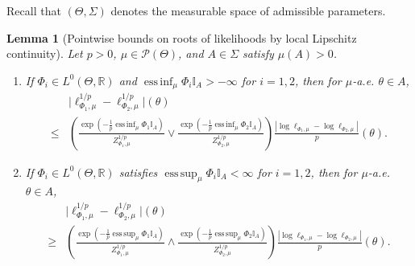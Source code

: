 \documentclass[a4paper]{scrartcl}
\newtheorem{lemma}[theorem]{Lemma}
\theoremstyle{definition}
\numberwithin{equation}{section}
\newcommand{\R}{\mathbb{R}}
\DeclareMathOperator*{\essinf}{ess\,inf}
\DeclareMathOperator*{\esssup}{ess\,sup}
\newcommand{\abs}[1]{\vert #1\vert}
\newcommand{\Abs}[1]{\left\vert#1\right\vert}
\begin{document}
Recall that $(\Theta,\Sigma)$ denotes the measurable space of admissible parameters.
\begin{lemma}[Pointwise bounds on roots of likelihoods by local Lipschitz continuity]
\label{lemma_preliminary_bounds_on_pth_root_likelihoods}
Let $p>0$, $\mu\in\mathcal{P}(\Theta)$, and $A\in\Sigma$ satisfy $\mu(A)>0$.
\begin{enumerate}
 \item \label{item_lemma_preliminary_bounds_on_pth_root_likelihoods_upper_bound}
 If $\Phi_i\in L^0(\Theta,\R)$ and $\essinf_\mu \Phi_i \mathbb{I}_A>-\infty$ for $i=1,2$, then for $\mu$-a.e. $\theta\in A$,
 \begin{align*}
   &\abs{\ell_{\Phi_1,\mu}^{1/p}-\ell_{\Phi_2,\mu}^{1/p}}(\theta)
   \\
   \leq&  \left(\frac{\exp(-\tfrac{1}{p}\essinf_\mu\Phi_1\mathbb{I}_A)}{Z_{\Phi_1,\mu}^{1/p}}\vee \frac{\exp(-\tfrac{1}{p}\essinf_\mu\Phi_2\mathbb{I}_A)}{Z_{\Phi_2,\mu}^{1/p}}\right)\frac{\Abs{\log\ell_{\Phi_1,\mu}-\log\ell_{\Phi_2,\mu}}}{p}(\theta).
 \end{align*}

\item \label{item_lemma_preliminary_bounds_on_pth_root_likelihoods_lower_bound}
If $\Phi_i\in L^0(\Theta,\R)$ satisfies $\esssup_\mu \Phi_i \mathbb{I}_A<\infty$ for $i=1,2$, then for $\mu$-a.e. $\theta\in A$,
\begin{align*}
  &\abs{\ell_{\Phi_1,\mu}^{1/p}-\ell_{\Phi_2,\mu}^{1/p}}(\theta)
  \\
  \geq &\left( \frac{\exp(-\tfrac{1}{p}\esssup_\mu\Phi_1\mathbb{I}_A)}{Z_{\Phi_1,\mu}^{1/p}}\wedge \frac{\exp(-\tfrac{1}{p}\esssup_\mu\Phi_2\mathbb{I}_A)}{Z_{\Phi_2,\mu}^{1/p}}\right)\frac{\Abs{\log\ell_{\Phi_1,\mu}-\log\ell_{\Phi_2,\mu}}}{p}(\theta).
 \end{align*} 
\end{enumerate}
 \end{lemma}
\end{document}
